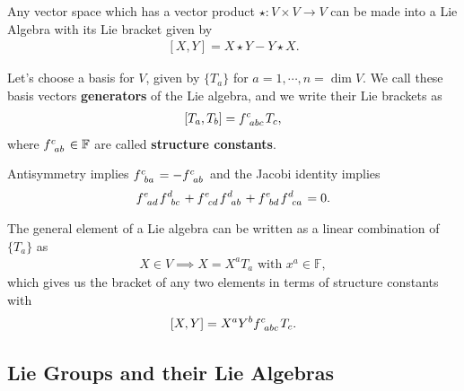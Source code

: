 \begin{note}
    Any vector space which has a vector product $\star : V \times V \to V$ can be made into a Lie Algebra with its Lie bracket given by
    \begin{align}
        \left[ X, Y \right] = X \star Y - Y \star X
    .\end{align}
\end{note}


\begin{definition} \label{def:structure_constants}
    Let's choose a basis for $V$, given by $\{T_a\} $ for $a = 1, \cdots, n = \dim V$. We call these basis vectors \textbf{generators} of the Lie algebra, and we write their Lie brackets as
\begin{align}
    \left[ T_a, T_b \right] = \tensor{f}{^{c}_{abc}} T_c
,\end{align}
where $\tensor{f}{^{c}_{ab}} \in \mathbb{F}$ are called \textbf{structure constants}. 
\end{definition}

Antisymmetry implies $\tensor{f}{^{c}_{ba}} = - \tensor{f}{^{c}_{ab}}$ and the Jacobi identity implies
\begin{align}
    \tensor{f}{^{e}_{ad}} \tensor{f}{^{d}_{bc}} + \tensor{f}{^{e}_{cd}} \tensor{f}{^{d}_{ab}} + \tensor{f}{^{e}_{bd}} \tensor{f}{^{d}_{ca}} = 0
.\end{align}

The general element of a Lie algebra can be written as a linear combination of $\{T_a\} $ as
\begin{align}
    X \in V \implies X = X^{a} T_a \text{~with~} x^{a} \in \mathbb{F}
,\end{align}
which gives us the bracket of any two elements in terms of structure constants with
\begin{align}
    \left[ X, Y \right] = X^{a} Y^{b} \tensor{f}{^{c}_{abc}} T_c
.\end{align}


\subsection{Lie Groups and their Lie Algebras}

